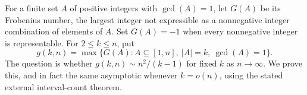 For a finite set $A$ of positive integers with $\gcd(A)=1$, let $G(A)$ be its Frobenius number, the largest integer not expressible as a nonnegative integer combination of elements of $A$. Set $G(A)=-1$ when every nonnegative integer is representable. For $2\le k\le n$, put
\[g(k,n)=\max\{G(A):A\subseteq[1,n],\ |A|=k,\ \gcd(A)=1\}.
\]
The question is whether $g(k,n)\sim n^2/(k-1)$ for fixed $k$ as $n\to\infty$. We prove this, and in fact the same asymptotic whenever $k=o(n)$, using the stated external interval-count theorem.
